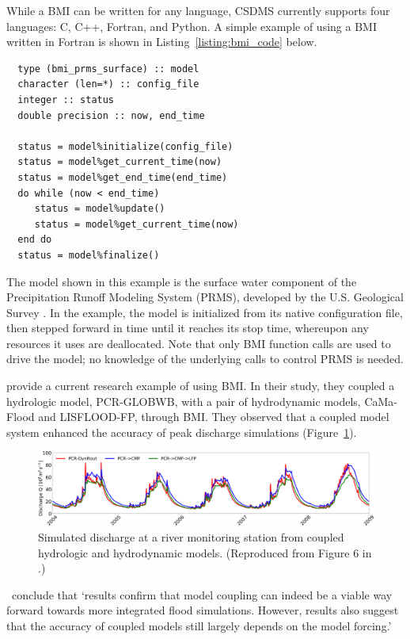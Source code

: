 \documentclass{article} %
\begin{document}
While a BMI can be written for any language,
CSDMS currently supports four languages: C, C++, Fortran, and Python.
A simple example of using a BMI written in Fortran
is shown in Listing~\ref{listing:bmi_code} below.
%
\begin{listing}[ht]
\begin{verbatim}
  type (bmi_prms_surface) :: model
  character (len=*) :: config_file
  integer :: status
  double precision :: now, end_time

  status = model%initialize(config_file)
  status = model%get_current_time(now)
  status = model%get_end_time(end_time)
  do while (now < end_time)
     status = model%update()
     status = model%get_current_time(now)
  end do
  status = model%finalize()
\end{verbatim}
\label{listing:bmi_code}
\end{listing}
%
The model shown in this example
is the surface water component of the Precipitation Runoff Modeling System (PRMS),
developed by the U.S. Geological Survey \citep{leavesley1984precipitation}.
In the example,
the model is initialized from its native configuration file,
then stepped forward in time until it reaches its stop time,
whereupon any resources it uses are deallocated.
Note that only BMI function calls are used to drive the model;
no knowledge of the underlying calls to control PRMS is needed.

\cite{hoch2019evaluating} provide a current research example of using BMI. 
In their study,
they coupled a hydrologic model, PCR-GLOBWB,
with a pair of hydrodynamic models, CaMa-Flood and LISFLOOD-FP,
through BMI.
They observed that a coupled model system
enhanced the accuracy of peak discharge simulations (Figure~\ref{fig:hoch_2019_fig6}).
%
\begin{figure}[h!]
\centering
\includegraphics[scale=0.8]{Figures/nhess-19-1723-2019-f06.png}
\caption{Simulated discharge at a river monitoring station from coupled hydrologic and hydrodynamic models. (Reproduced from Figure 6 in \citet{hoch2019evaluating}.)}
\label{fig:hoch_2019_fig6}
\end{figure}
%
\citeauthor{hoch2019evaluating}\ conclude
that `results confirm that model coupling can indeed be a viable way forward towards more integrated flood simulations. However, results also suggest that the accuracy of coupled models still largely depends on the model forcing.'
\end{document}
